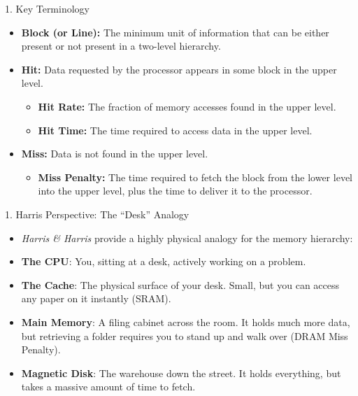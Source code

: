 \documentclass[aspectratio=169]{beamer}
\begin{document}
\begin{frame}{1. Key Terminology}
\begin{itemize}
    \item \textbf{Block (or Line):} The minimum unit of information that can be either present or not present in a two-level hierarchy.
    \item \textbf{Hit:} Data requested by the processor appears in some block in the upper level.
    \begin{itemize}
        \item \textbf{Hit Rate:} The fraction of memory accesses found in the upper level.
        \item \textbf{Hit Time:} The time required to access data in the upper level.
    \end{itemize}
    \item \textbf{Miss:} Data is not found in the upper level.
    \begin{itemize}
        \item \textbf{Miss Penalty:} The time required to fetch the block from the lower level into the upper level, plus the time to deliver it to the processor.
    \end{itemize}
\end{itemize}
\end{frame}

\begin{frame}{1. Harris Perspective: The ``Desk'' Analogy}
\begin{itemize}
    \item \textit{Harris \& Harris} provide a highly physical analogy for the memory hierarchy:
    \vspace{0.3cm}
    \item \textbf{The CPU}: You, sitting at a desk, actively working on a problem.
    \item \textbf{The Cache}: The physical surface of your desk. Small, but you can access any paper on it instantly (SRAM).
    \item \textbf{Main Memory}: A filing cabinet across the room. It holds much more data, but retrieving a folder requires you to stand up and walk over (DRAM Miss Penalty).
    \item \textbf{Magnetic Disk}: The warehouse down the street. It holds everything, but takes a massive amount of time to fetch.
\end{itemize}
\end{frame}
\end{document}
